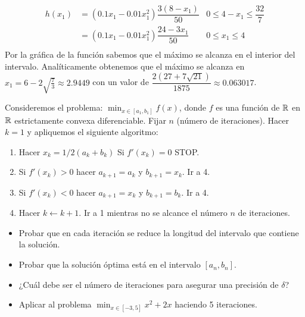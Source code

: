 \documentclass[twoside]{article}
\begin{document}
\begin{solucion}
\begin{itemize}
\begin{align*}
h(x_1) &= (0.1x_1-0.01x_1^2)\dfrac{3(8-x_1)}{50} & 0\leq 4-x_1 \leq \dfrac{32}{7}\\
&=(0.1x_1-0.01x_1^2)\dfrac{24-3x_1}{50} & 0 \leq x_1 \leq 4\\
\end{align*}
Por la gráfica de la función sabemos que el máximo se alcanza en el interior del intervalo. Analíticamente obtenemos que el máximo se alcanza en $x_1=6-2\sqrt{\frac{7}{3}}\approx 2.9449$ con un valor de $\dfrac{2(27+7\sqrt{21})}{1875}\approx0.063017$.
\end{itemize}
\end{solucion}

\newpage

\begin{ejercicio}{2}
Consideremos el problema: $\min_{x\in[a_1,b_1]}f(x)$, donde $f$ es una función de $\mathbb{R}$ en $\mathbb{R}$ estrictamente convexa diferenciable. Fijar $n$ (número de iteraciones). Hacer $k=1$ y apliquemos el siguiente algoritmo:
\begin{enumerate}
\item Hacer $x_k=1/2(a_k+b_k)$ Si $f'(x_k)=0$ STOP.
\item Si $f'(x_k)>0$ hacer $a_{k+1}=a_k$ y $b_{k+1}=x_k$. Ir a 4.
\item Si $f'(x_k)<0$ hacer $a_{k+1}=x_k$ y $b_{k+1}=b_k$. Ir a 4. 
\item Hacer $k\leftarrow k+1$. Ir a 1 mientras no se alcance el número $n$ de iteraciones.
\end{enumerate}
\begin{itemize}
\item Probar que en cada iteración se reduce la longitud del intervalo que contiene la solución.
\item Probar que la solución óptima está en el intervalo $[a_n,b_n]$. 
\item ¿Cuál debe ser el número de iteraciones para asegurar una precisión de $\delta$?
\item Aplicar al problema $\min_{x\in[-3,5]}x^2+2x$ haciendo 5 iteraciones.
\end{itemize}
\end{ejercicio}
\end{document}
